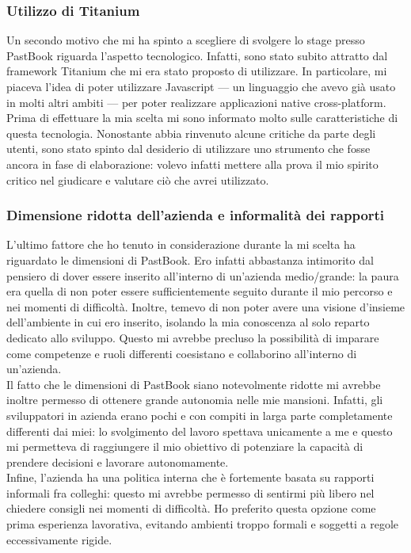 			\subsubsection{Utilizzo di Titanium}
				Un secondo motivo che mi ha spinto a scegliere di svolgere lo stage presso PastBook riguarda l'aspetto tecnologico.
				Infatti, sono stato subito attratto dal framework Titanium che mi era stato proposto di utilizzare. In particolare,
				mi piaceva l'idea di poter utilizzare Javascript — un linguaggio che avevo già usato in molti altri ambiti — per
				poter realizzare applicazioni native cross-platform.\\
				Prima di effettuare la mia scelta mi sono informato molto sulle caratteristiche di questa tecnologia. Nonostante
				abbia rinvenuto alcune critiche da parte degli utenti, sono stato spinto dal desiderio di utilizzare uno strumento
				che fosse ancora in fase di elaborazione: volevo infatti mettere alla prova il mio spirito critico nel giudicare e
				valutare ciò che avrei utilizzato.
			\subsubsection{Dimensione ridotta dell'azienda e informalità dei rapporti}
				L'ultimo fattore che ho tenuto in considerazione durante la mi scelta ha riguardato le dimensioni di PastBook. Ero
				infatti abbastanza intimorito dal pensiero di dover essere inserito all'interno di un'azienda medio/grande: la paura
				era quella di non poter essere sufficientemente seguito durante il mio percorso e nei momenti di difficoltà. Inoltre,
				temevo di non poter avere una visione d'insieme dell'ambiente in cui ero inserito, isolando la mia conoscenza al
				solo reparto dedicato allo sviluppo. Questo mi avrebbe precluso la possibilità di imparare come competenze e ruoli
				differenti coesistano e collaborino all'interno di un'azienda.\\
				Il fatto che le dimensioni di PastBook siano notevolmente ridotte mi avrebbe inoltre permesso di ottenere grande
				autonomia nelle mie mansioni. Infatti, gli sviluppatori in azienda erano pochi e con compiti in larga parte
				completamente differenti dai miei: lo svolgimento del lavoro spettava unicamente a me e questo mi permetteva di
				raggiungere il mio obiettivo di potenziare la capacità di prendere decisioni e lavorare autonomamente.\\
				Infine, l'azienda ha una politica interna che è fortemente basata su rapporti informali fra colleghi: questo mi
				avrebbe permesso di sentirmi più libero nel chiedere consigli nei momenti di difficoltà. Ho preferito questa opzione
				come prima esperienza lavorativa, evitando ambienti troppo formali e soggetti a regole eccessivamente rigide.
